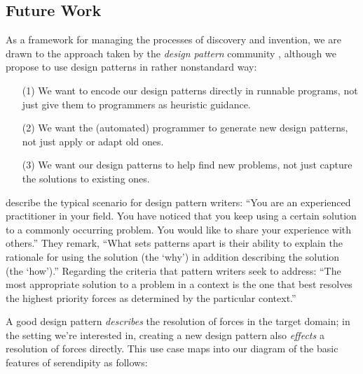 \subsection{Future Work} \label{sec:futurework} \label{sec:hatching}

As a framework for managing the processes of discovery and invention,
we are drawn to the approach taken by the \emph{design pattern}
community \cite{alexander1999origins}, although we
propose to use design patterns in rather nonstandard way:
\begin{itemize}
\item[(1)] We want to encode our design patterns directly in runnable
  programs, not just give them to programmers as heuristic guidance.
\item[(2)] We want the (automated) programmer to generate new design
  patterns, not just apply or adapt old ones.
\item[(3)] We want our design patterns to help find new problems,
  not just capture the solutions to existing ones.
\end{itemize}

 describe the typical scenario for design
pattern writers: ``You are an experienced practitioner in your
field. You have noticed that you keep using a certain solution to a
commonly occurring problem. You would like to share your experience
with others.''  They remark, ``What sets patterns apart is their
ability to explain the rationale for using the solution (the `why') in
addition describing the solution (the `how').''  Regarding the
criteria that pattern writers seek to address: ``The most
appropriate solution to a problem in a context is the one that best
resolves the highest priority forces as determined by the particular
context.''  %

A good design pattern \emph{describes} the resolution of forces in the
target domain; in the setting we're interested in, creating a new
design pattern also \emph{effects} a resolution of forces directly.
This use case maps into our diagram of the basic features of serendipity as follows:

%

